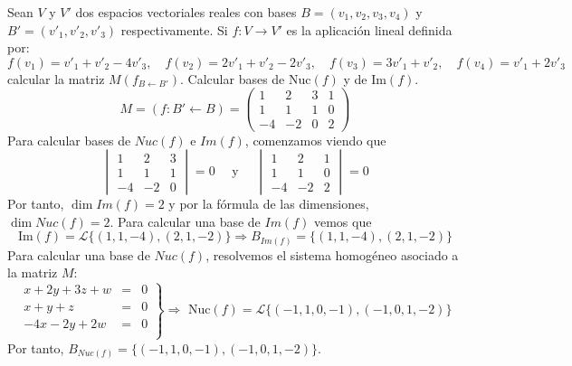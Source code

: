 \begin{ejercicio}
	Sean \( V \) y \( V' \) dos espacios vectoriales reales con bases \( B = (v_1, v_2, v_3, v_4) \) y \( B' = (v'_1, v'_2, v'_3) \) respectivamente. Si \( f : V \rightarrow V' \) es la aplicación lineal definida por:
	\[ f(v_1) = v'_1 + v'_2 - 4v'_3, \quad f(v_2) = 2v'_1 + v'_2 - 2v'_3, \quad f(v_3) = 3v'_1 + v'_2 , \quad f(v_4) = v'_1 + 2v'_3 \]
	calcular la matriz \( M(f_{B \leftarrow B'}) \). Calcular bases de \( \text{Nuc}(f) \) y de \( \text{Im}(f) \).
	\begin{equation*}
		M = (f:B' \leftarrow B) = \begin{pmatrix}
			1  & 2  & 3 & 1 \\
			1  & 1  & 1 & 0 \\
			-4 & -2 & 0 & 2
		\end{pmatrix}
	\end{equation*}
	Para calcular bases de $Nuc(f)$ e $Im(f)$, comenzamos viendo que
	\begin{equation*}
		\begin{vmatrix}
			1  & 2  & 3 \\
			1  & 1  & 1 \\
			-4 & -2 & 0
		\end{vmatrix} = 0 \quad \text{ y } \quad
		\begin{vmatrix}
			1  & 2  & 1 \\
			1  & 1  & 0 \\
			-4 & -2 & 2
		\end{vmatrix} = 0
	\end{equation*}
	Por tanto, $\dim{Im(f)} = 2$ y por la fórmula de las dimensiones, $\dim{Nuc(f)} = 2$. Para calcular una base de $Im(f)$ vemos que
	\begin{equation*}
		\text{Im}(f) = \mathcal{L}\{(1,1,-4),(2,1,-2)\} \Rightarrow B_{Im(f)} = \{(1,1,-4),(2,1,-2)\}
	\end{equation*}
	Para calcular una base de $Nuc(f)$, resolvemos el sistema homogéneo asociado a la matriz $M$:
	\begin{equation*}
		\left.\begin{array}{rcl}
			x+2y+3z+w  & = & 0 \\
			x+y+z      & = & 0 \\
			-4x-2y +2w & = & 0 \\
		\end{array} \right\} \Rightarrow \text{ Nuc}(f) = \mathcal{L}\{(-1,1,0,-1),(-1,0,1,-2)\}
	\end{equation*}
	Por tanto, $B_{Nuc(f)} = \{(-1,1,0,-1),(-1,0,1,-2)\}$.
\end{ejercicio}


